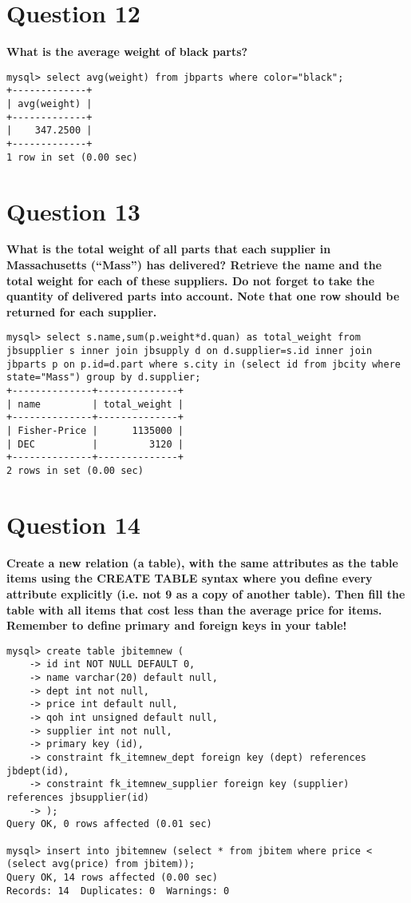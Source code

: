 \documentclass{article}
\begin{document}
\section*{Question 12}
\textbf{What is the average weight of black parts?}

\begin{lstlisting}
mysql> select avg(weight) from jbparts where color="black";
+-------------+
| avg(weight) |
+-------------+
|    347.2500 |
+-------------+
1 row in set (0.00 sec)
\end{lstlisting}

\section*{Question 13}
\textbf{What is the total weight of all parts that each supplier in Massachusetts (“Mass”) has delivered? Retrieve the name and the total weight for each of these suppliers. Do not forget to take the quantity of delivered parts into account. Note that one row should be returned for each supplier.}

\begin{lstlisting}
mysql> select s.name,sum(p.weight*d.quan) as total_weight from jbsupplier s inner join jbsupply d on d.supplier=s.id inner join jbparts p on p.id=d.part where s.city in (select id from jbcity where state="Mass") group by d.supplier;
+--------------+--------------+
| name         | total_weight |
+--------------+--------------+
| Fisher-Price |      1135000 |
| DEC          |         3120 |
+--------------+--------------+
2 rows in set (0.00 sec)
\end{lstlisting}

\pagebreak

\section*{Question 14}
\textbf{Create a new relation (a table), with the same attributes as the table items using the CREATE TABLE syntax where you define every attribute explicitly (i.e. not
9
as a copy of another table). Then fill the table with all items that cost less than the average price for items. Remember to define primary and foreign keys in your table!}

\begin{lstlisting}
mysql> create table jbitemnew (
    -> id int NOT NULL DEFAULT 0,
    -> name varchar(20) default null,
    -> dept int not null,
    -> price int default null,
    -> qoh int unsigned default null,
    -> supplier int not null,
    -> primary key (id),
    -> constraint fk_itemnew_dept foreign key (dept) references jbdept(id),
    -> constraint fk_itemnew_supplier foreign key (supplier) references jbsupplier(id)
    -> );
Query OK, 0 rows affected (0.01 sec)

mysql> insert into jbitemnew (select * from jbitem where price < (select avg(price) from jbitem));
Query OK, 14 rows affected (0.00 sec)
Records: 14  Duplicates: 0  Warnings: 0

\end{lstlisting}
\end{document}
